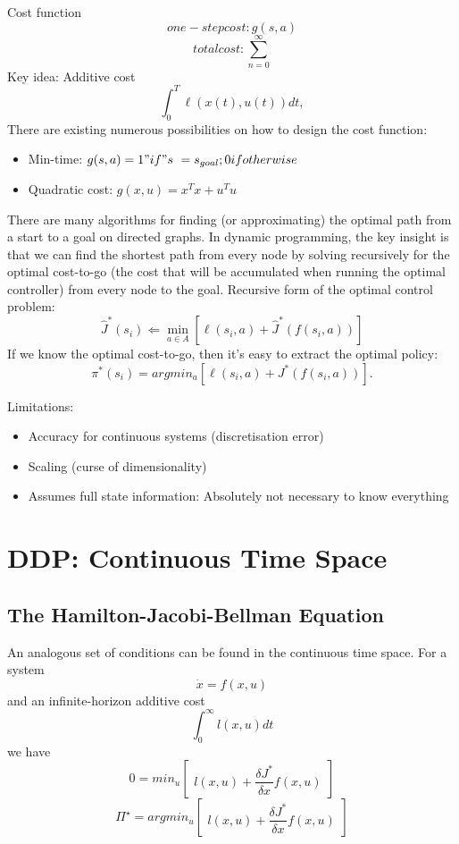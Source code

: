Cost function
$$one-step cost: g(s,a)$$
$$total cost: \sum_{n=0}^{\infty} $$
Key idea: Additive cost 
$$\int_0^T \ell(x(t),u(t)) dt,$$
There are existing numerous possibilities on how to design the cost function:
\begin{itemize}
\item Min-time: $g(s,a) = 1 "if" s~=s_{goal}; 0 if otherwise$
\item Quadratic cost: $g(x,u)=x^{T}x+u^{T}u$
\end{itemize}
There are many algorithms for finding (or approximating) the optimal path from a start to a goal on directed graphs. In dynamic programming, the key insight is that we can find the shortest path from every node by solving recursively for the optimal cost-to-go (the cost that will be accumulated when running the optimal controller) from every node to the goal.
Recursive form of the optimal control problem:
\begin{equation} \hat{J}^*(s_i) \Leftarrow \min_{a \in A} \left[ \ell(s_i,a) +
    \hat{J}^*\left({f(s_i,a)}\right) \right]
    \end{equation}
If we know the optimal cost-to-go, then it's easy to extract the optimal policy:
\begin{equation} \pi^{*}(s_i) = argmin_a
    \left[ \ell(s_i,a) + J^*\left( f(s_i,a) \right) \right].
\end{equation}

Limitations:
\begin{itemize}
\item Accuracy for continuous systems (discretisation error)
\item Scaling (curse of dimensionality)
\item Assumes full state information: Absolutely not necessary to know everything
\end{itemize}


\section{DDP: Continuous Time Space}
\subsection{The Hamilton-Jacobi-Bellman Equation}
An analogous set of conditions can be found in the continuous time space. For a system
$$ \dot{x}=f(x,u)$$
and an infinite-horizon additive cost
$$\int_0^\infty l(x,u)dt $$
we have
$$0=min_u \begin{bmatrix}
l(x,u)+\dfrac{\delta J^*}{\delta x}f(x,u)
\end{bmatrix}$$
$$\Pi^\star=argmin_u\begin{bmatrix}
l(x,u)+\dfrac{\delta J^*}{\delta x}f(x,u)
\end{bmatrix}$$







